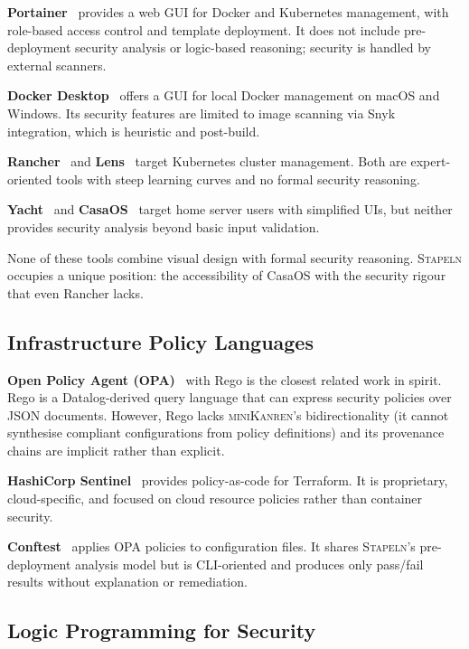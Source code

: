 \documentclass[11pt,twocolumn]{article}
\newcommand{\stapeln}{\textsc{Stapeln}\xspace}
\newcommand{\minikanren}{\textsc{miniKanren}\xspace}
\begin{document}
\textbf{Portainer}~\cite{portainer2024} provides a web GUI for Docker
and Kubernetes management, with role-based access control and template
deployment. It does not include pre-deployment security analysis or
logic-based reasoning; security is handled by external scanners.

\textbf{Docker Desktop}~\cite{dockerdesktop2024} offers a GUI for
local Docker management on macOS and Windows. Its security features
are limited to image scanning via Snyk integration, which is heuristic
and post-build.

\textbf{Rancher}~\cite{rancher2024} and \textbf{Lens}~\cite{lens2024}
target Kubernetes cluster management. Both are expert-oriented tools
with steep learning curves and no formal security reasoning.

\textbf{Yacht}~\cite{yacht2024} and \textbf{CasaOS}~\cite{casaos2024}
target home server users with simplified UIs, but neither provides
security analysis beyond basic input validation.

None of these tools combine visual design with formal security
reasoning. \stapeln occupies a unique position: the accessibility of
CasaOS with the security rigour that even Rancher lacks.

\subsection{Infrastructure Policy Languages}

\textbf{Open Policy Agent (OPA)}~\cite{opa2024} with Rego is the
closest related work in spirit. Rego is a Datalog-derived query
language that can express security policies over JSON documents.
However, Rego lacks \minikanren's bidirectionality (it cannot
synthesise compliant configurations from policy definitions) and its
provenance chains are implicit rather than explicit.

\textbf{HashiCorp Sentinel}~\cite{sentinel2024} provides policy-as-code
for Terraform. It is proprietary, cloud-specific, and focused on
cloud resource policies rather than container security.

\textbf{Conftest}~\cite{conftest2024} applies OPA policies to
configuration files. It shares \stapeln's pre-deployment analysis
model but is CLI-oriented and produces only pass/fail results without
explanation or remediation.

\subsection{Logic Programming for Security}
\end{document}

